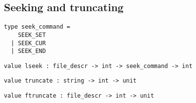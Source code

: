 \subsection*{Seeking and truncating }\begin{verbatim}
type seek_command =
    SEEK_SET
  | SEEK_CUR
  | SEEK_END
\end{verbatim}
\begin{comment}
 Positioning modes for \verblseek. \verbSEEK_SET indicates positions
           relative to the beginning of the file, \verbSEEK_CUR relative to
           the current position, \verbSEEK_END relative to the end of the
           file. 
\end{comment}
\begin{verbatim}
value lseek : file_descr -> int -> seek_command -> int
\end{verbatim}
%
\begin{comment}
 Set the current position for a file descriptor 
\end{comment}
\begin{verbatim}
value truncate : string -> int -> unit
\end{verbatim}
%
\begin{comment}
 Truncates the named file to the given size. 
\end{comment}
\begin{verbatim}
value ftruncate : file_descr -> int -> unit
\end{verbatim}
%
\begin{comment}
 Truncates the file corresponding to the given descriptor
           to the given size. 
\end{comment}
